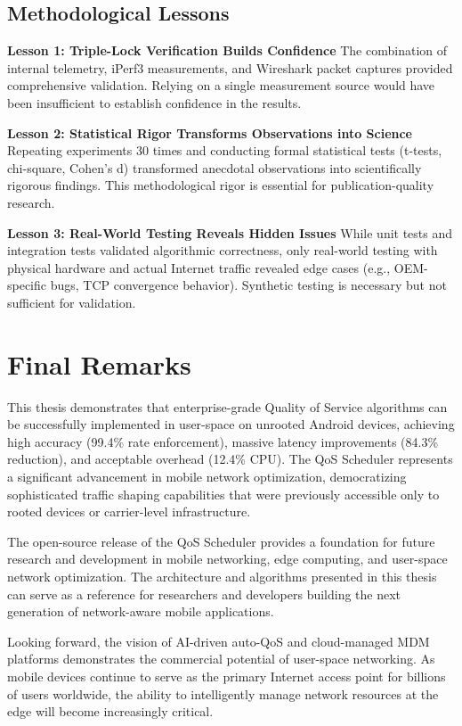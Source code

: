 \subsection{Methodological Lessons}

\textbf{Lesson 1: Triple-Lock Verification Builds Confidence}
The combination of internal telemetry, iPerf3 measurements, and Wireshark packet captures provided comprehensive validation. Relying on a single measurement source would have been insufficient to establish confidence in the results.

\textbf{Lesson 2: Statistical Rigor Transforms Observations into Science}
Repeating experiments 30 times and conducting formal statistical tests (t-tests, chi-square, Cohen's d) transformed anecdotal observations into scientifically rigorous findings. This methodological rigor is essential for publication-quality research.

\textbf{Lesson 3: Real-World Testing Reveals Hidden Issues}
While unit tests and integration tests validated algorithmic correctness, only real-world testing with physical hardware and actual Internet traffic revealed edge cases (e.g., OEM-specific bugs, TCP convergence behavior). Synthetic testing is necessary but not sufficient for validation.

\section{Final Remarks}
\label{sec:final_remarks}

This thesis demonstrates that enterprise-grade Quality of Service algorithms can be successfully implemented in user-space on unrooted Android devices, achieving high accuracy (99.4\% rate enforcement), massive latency improvements (84.3\% reduction), and acceptable overhead (12.4\% CPU). The QoS Scheduler represents a significant advancement in mobile network optimization, democratizing sophisticated traffic shaping capabilities that were previously accessible only to rooted devices or carrier-level infrastructure.

The open-source release of the QoS Scheduler provides a foundation for future research and development in mobile networking, edge computing, and user-space network optimization. The architecture and algorithms presented in this thesis can serve as a reference for researchers and developers building the next generation of network-aware mobile applications.

Looking forward, the vision of AI-driven auto-QoS and cloud-managed MDM platforms demonstrates the commercial potential of user-space networking. As mobile devices continue to serve as the primary Internet access point for billions of users worldwide, the ability to intelligently manage network resources at the edge will become increasingly critical.

